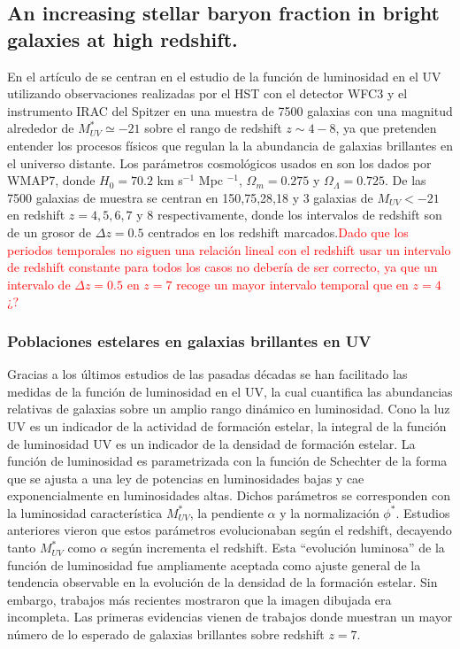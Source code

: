 
\subsection*{An increasing stellar baryon fraction in bright galaxies at high redshift.}
En el artículo de \cite{finkelstein2015increasing} se centran en el estudio de la función de luminosidad en el UV utilizando observaciones realizadas por el HST con el detector WFC3 y el instrumento IRAC del Spitzer en una muestra de 7500 galaxias con una magnitud alrededor de $M_{UV}^*\simeq -21$ sobre el rango de redshift $z\sim 4-8$, ya que pretenden entender los procesos físicos que regulan la la abundancia de galaxias brillantes en el universo distante. Los parámetros cosmológicos usados en \cite{finkelstein2015increasing} son los dados por WMAP7, donde $H_0=70.2$ km s$^{-1}$ Mpc $^{-1}$, $\Omega_m=0.275$ y $\Omega_\Lambda=0.725$. De las 7500 galaxias de muestra se centran en 150,75,28,18 y 3 galaxias de $M_{UV}<-21$ en redshift $z=4,5,6,7$ y 8 respectivamente, donde los intervalos de redshift son de un grosor de $\Delta z=0.5$ centrados en los redshift marcados.\textcolor{red}{Dado que los periodos temporales no siguen una relación lineal con el redshift usar un intervalo de redshift constante para todos los casos no debería de ser correcto, ya que un intervalo de $\Delta z=0.5$ en $z=7$ recoge un mayor intervalo temporal que en $z=4$ ¿?}\\


\subsubsection*{Poblaciones estelares en galaxias brillantes en UV}
Gracias a los últimos estudios de las pasadas décadas se han facilitado las medidas de la función de luminosidad en el UV, la cual cuantifica las abundancias relativas de galaxias sobre un amplio rango dinámico en luminosidad. Cono la luz UV es un indicador de la actividad de formación estelar, la integral de la función de luminosidad UV es un indicador de la densidad de formación estelar. La función de luminosidad es parametrizada con la función de Schechter de la forma que se ajusta a una ley de potencias en luminosidades bajas y cae exponencialmente en luminosidades altas. Dichos parámetros se corresponden con la luminosidad característica $M_{UV}^*$, la pendiente $\alpha$ y la normalización $\phi^*$. Estudios anteriores vieron que estos parámetros evolucionaban según el redshift, decayendo tanto $M_{UV}^*$ como $\alpha$ según incrementa el redshift. Esta ``evolución luminosa'' de la función de luminosidad fue ampliamente aceptada como ajuste general de la tendencia observable en la evolución de la densidad de la formación estelar. Sin embargo, trabajos más recientes mostraron que la imagen dibujada era incompleta. Las primeras evidencias vienen de trabajos donde muestran un mayor número de lo esperado de galaxias brillantes sobre redshift $z=7$. \\

